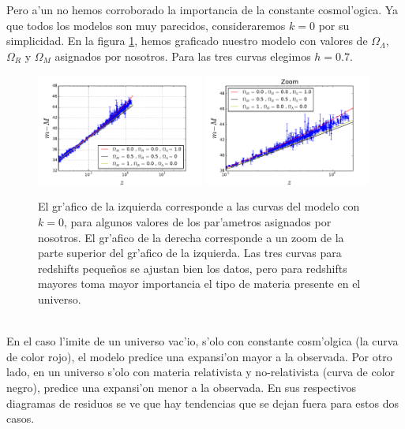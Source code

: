 
Pero a'un no hemos corroborado la importancia de la constante cosmol'ogica. Ya que todos los modelos son muy parecidos, consideraremos $k=0$ por su simplicidad. 
En la figura \ref{parametros}, hemos graficado nuestro modelo con valores de $\Omega_\Lambda$, $\Omega_R$ y $\Omega_M$ asignados por nosotros. Para las tres curvas
elegimos $h=0.7$.
\begin{figure}[h!]
  \centering
\includegraphics[width=0.49\textwidth]{fig/parametros_de_prueba.pdf}
\includegraphics[width=0.49\textwidth]{fig/zoom.pdf}
 \caption{El gr'afico de la izquierda corresponde a las curvas del modelo con $k=0$, para algunos valores de los par'ametros asignados por nosotros. 
 El gr'afico de la derecha corresponde a un zoom de la parte superior del gr'afico de la izquierda. Las tres curvas para redshifts peque\~nos se ajustan bien los datos, pero para redshifts mayores toma mayor importancia el
 tipo de materia presente en el universo.}
  \label{parametros}
\end{figure}\\
En el caso l'imite de un universo vac'io, s'olo con constante cosm'olgica (la curva de color rojo), el modelo predice una expansi'on mayor a la observada. Por otro lado, en un universo
s'olo con materia relativista y no-relativista (curva de color negro), predice una expansi'on menor a la observada. En sus respectivos diagramas de residuos se
ve que hay tendencias que se dejan fuera para estos dos casos.\\
